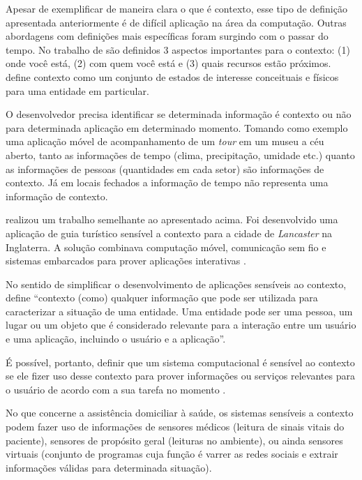 Apesar de exemplificar de maneira clara o que é contexto, esse tipo de definição
apresentada anteriormente é de difícil aplicação na área da computação.
Outras abordagens com definições mais específicas foram surgindo com o
passar do tempo. No trabalho de  são definidos 3 aspectos
importantes para o contexto: (1) onde você está, (2) com quem você está e (3)
quais recursos estão próximos.  define contexto 
como um conjunto de estados de interesse conceituais e físicos para uma entidade 
em particular.

O desenvolvedor precisa identificar se determinada informação é contexto ou não
para determinada aplicação em determinado momento. Tomando como exemplo uma
aplicação móvel de acompanhamento de um \textit{tour} em um museu a céu aberto, 
tanto as informações de tempo (clima, precipitação, umidade etc.) quanto as 
informações de pessoas (quantidades em cada setor) são informações de contexto.
Já em locais fechados a informação de tempo não representa uma informação de 
contexto.

 realizou um trabalho semelhante ao apresentado
acima. Foi desenvolvido uma aplicação de guia turístico sensível a contexto
para a cidade de \textit{Lancaster} na Inglaterra. A solução combinava
computação móvel, comunicação sem fio e sistemas embarcados para prover
aplicações interativas \cite{davies1999caches}.

No sentido de simplificar o desenvolvimento de aplicações sensíveis ao
contexto,  define ``contexto (como) qualquer
informação que pode ser utilizada para caracterizar a situação de uma entidade.
Uma entidade pode ser uma pessoa, um lugar ou um objeto que é considerado
relevante para a interação entre um usuário e uma aplicação, incluindo o
usuário e a aplicação''.

É possível, portanto, definir que um sistema computacional é sensível ao contexto
se ele fizer uso desse contexto para prover informações ou serviços relevantes para
o usuário de acordo com a sua tarefa no momento \cite{dey2001understanding}.

No que concerne a assistência domiciliar à saúde, os sistemas sensíveis a
contexto podem fazer uso de informações de sensores médicos (leitura de sinais 
vitais do paciente), sensores de propósito geral (leituras no ambiente), 
ou ainda sensores virtuais (conjunto de programas cuja função é varrer as redes 
sociais e extrair informações válidas para determinada situação).

